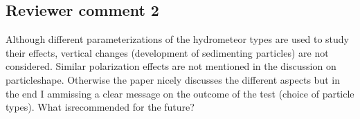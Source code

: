 \documentclass[11pt]{scrartcl}
\providecommand{\DIFadd}[1]{{\protect\textcolor{blue}{\uwave{#1}}}} %
\providecommand{\DIFaddbegin}{} %
\providecommand{\DIFaddFL}[1]{\DIFadd{#1}} %
\newenvironment{change}[1][]{%
  \begin{mdframed}[frametitle={Line #1:}]%
}{%
  \end{mdframed}%
}
\begin{document}
%
%
%

\subsection*{Reviewer comment 2}

Although different parameterizations of the hydrometeor types are used to
study their effects, vertical changes (development of sedimenting particles)
are not considered. Similar polarization effects are not mentioned in the
discussion on particleshape. Otherwise the paper nicely discusses the different
aspects but in the end I ammissing a clear message on the outcome of the test
(choice of particle types). What isrecommended for the future?
\end{document}
